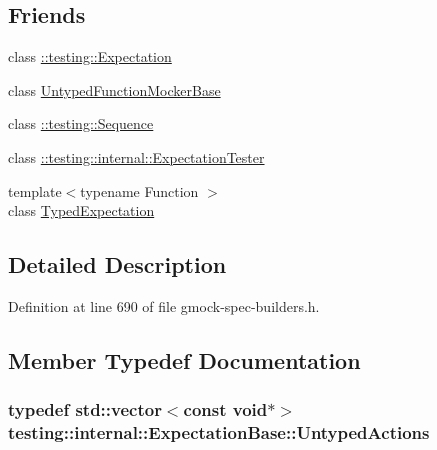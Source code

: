 \subsection*{Friends}
\begin{DoxyCompactItemize}
\item 
class \hyperlink{classtesting_1_1internal_1_1_expectation_base_a86fa3dccdc465d897ee321b74e4ce915}{\+::testing\+::\+Expectation}
\item 
class \hyperlink{classtesting_1_1internal_1_1_expectation_base_a3e5598b244ec7673d0a494477d71e559}{Untyped\+Function\+Mocker\+Base}
\item 
class \hyperlink{classtesting_1_1internal_1_1_expectation_base_aeaf43a487a21c0ac1135b094a1561056}{\+::testing\+::\+Sequence}
\item 
class \hyperlink{classtesting_1_1internal_1_1_expectation_base_a83859ffda7f75bb8b447063eb53cb8b8}{\+::testing\+::internal\+::\+Expectation\+Tester}
\item 
{\footnotesize template$<$typename Function $>$ }\\class \hyperlink{classtesting_1_1internal_1_1_expectation_base_a4f17de55396a8ef740d5ad2b1380a851}{Typed\+Expectation}
\end{DoxyCompactItemize}


\subsection{Detailed Description}


Definition at line 690 of file gmock-\/spec-\/builders.\+h.



\subsection{Member Typedef Documentation}
\subsubsection[{\texorpdfstring{Untyped\+Actions}{UntypedActions}}]{\setlength{\rightskip}{0pt plus 5cm}typedef std\+::vector$<$const void$\ast$$>$ {\bf testing\+::internal\+::\+Expectation\+Base\+::\+Untyped\+Actions}\hspace{0.3cm}{\ttfamily [protected]}}\hypertarget{classtesting_1_1internal_1_1_expectation_base_a9b21e82059961b9f1198d3f5d518254f}{}\label{classtesting_1_1internal_1_1_expectation_base_a9b21e82059961b9f1198d3f5d518254f}


